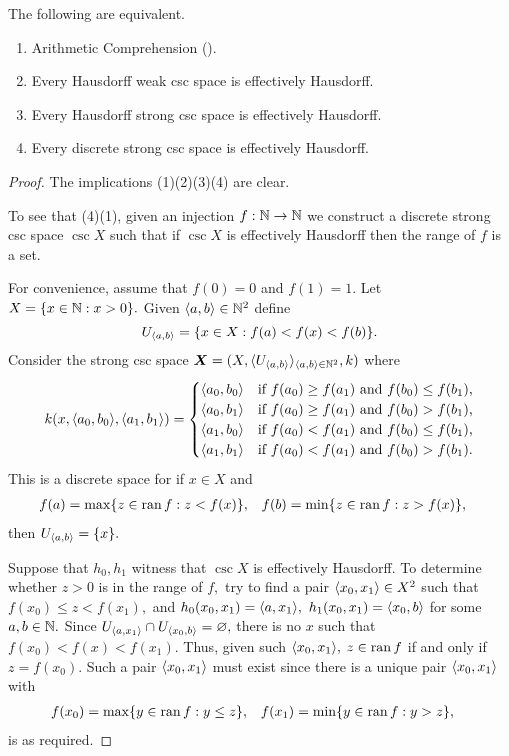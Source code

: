 \documentclass[csc]{subfiles}
\begin{document}
\begin{theorem}[\RCA]\label{T:Hausdorff}
  The following are equivalent.
  \begin{enumerate}[\upshape(1)]
  \item Arithmetic Comprehension \textup(\ACA\textup).
  \item Every Hausdorff weak csc space is effectively Hausdorff.
  \item Every Hausdorff strong csc space is effectively Hausdorff.
  \item Every discrete strong csc space is effectively Hausdorff.
  \end{enumerate}
\end{theorem}

\begin{proof}
  The implications (1)\THEN(2)\THEN(3)\THEN(4) are clear. 

  To see that (4)\THEN(1), given an injection \(f:\mathbb{N}\to\mathbb{N}\) we construct a discrete strong csc space \(\csc{X}\) such that if \(\csc{X}\) is effectively Hausdorff then the range of \(f\) is a set.

  For convenience, assume that \(f(0) = 0\) and \(f(1)=1.\) 
  Let \(X = \lbrace x \in \mathbb{N} : x > 0\rbrace.\)
  Given \(\langle a,b\rangle \in \mathbb{N}^2\) define \[U_{\langle a,b\rangle} = \lbrace x \in X : f(a) < f(x) < f(b)\rbrace.\]
  Consider the strong csc space \(\boldsymbol{X} = (X,\langle U_{\langle a,b\rangle}\rangle_{\langle a,b\rangle \in \mathbb{N}^2},k)\) where \[k(x,\langle a_0,b_0\rangle,\langle a_1,b_1\rangle) = \begin{cases}
      \langle a_0,b_0\rangle & \text{if $f(a_0) \geq f(a_1)$ and $f(b_0) \leq f(b_1)$,} \\
      \langle a_0,b_1\rangle & \text{if $f(a_0) \geq f(a_1)$ and $f(b_0) > f(b_1)$,} \\
      \langle a_1,b_0\rangle & \text{if $f(a_0) < f(a_1)$ and $f(b_0) \leq f(b_1)$,} \\
      \langle a_1,b_1\rangle & \text{if $f(a_0) < f(a_1)$ and $f(b_0) > f(b_1)$.} \\
    \end{cases}\]
  This is a discrete space for if \(x \in X\) and \[\begin{aligned}
      f(a) &= \max\lbrace z \in \operatorname{ran}\nolimits f : z < f(x)\rbrace, &
      f(b) &= \min\lbrace z \in \operatorname{ran}\nolimits f : z > f(x)\rbrace,
    \end{aligned}\] then \(U_{\langle a,b\rangle} = \lbrace x\rbrace.\)
  
  Suppose that \(h_0,h_1\) witness that \(\csc{X}\) is effectively Hausdorff.
  To determine whether \(z > 0\) is in the range of \(f,\) try to find a pair \(\langle x_0,x_1\rangle \in X^2\) such that \(f(x_0) \leq z < f(x_1),\) and \(h_0(x_0,x_1) = \langle a,x_1\rangle,\) \(h_1(x_0,x_1) = \langle x_0,b\rangle\) for some \(a,b \in \mathbb{N}.\)
  Since \(U_{\langle a,x_1\rangle} \cap U_{\langle x_0,b\rangle} = \varnothing,\) there is no \(x\) such that \(f(x_0) < f(x) < f(x_1).\) 
  Thus, given such \(\langle x_0,x_1\rangle,\) \(z \in \operatorname{ran}\nolimits f\) if and only if \(z = f(x_0).\)
  Such a pair \(\langle x_0,x_1\rangle\) must exist since there is a unique pair \(\langle x_0,x_1\rangle\) with \[\begin{aligned}
      f(x_0) &= \max\lbrace y \in \operatorname{ran}\nolimits f : y \leq z\rbrace, &
      f(x_1) &= \min\lbrace y \in \operatorname{ran}\nolimits f : y > z\rbrace,
    \end{aligned}\] is as required.
\end{proof}
\end{document}
